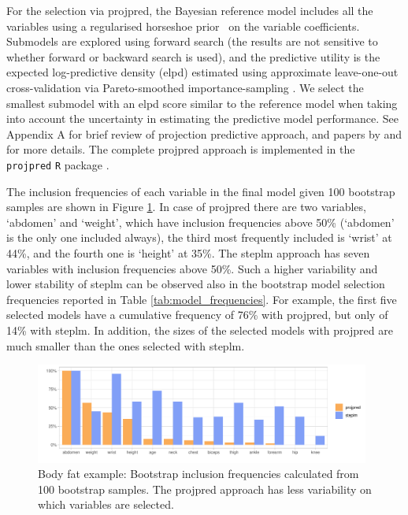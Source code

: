 \documentclass[a4]{article}
\theoremstyle{definition}
\begin{document}
For the selection via projpred, the Bayesian reference model includes
all the variables using a regularised horseshoe prior~\citep{paper:rhs} on the
variable coefficients. Submodels are explored using
forward search (the results are not sensitive to whether forward or
backward search is used), and the predictive utility is the expected
log-predictive density (elpd) estimated using approximate leave-one-out cross-validation via Pareto-smoothed importance-sampling
\citep[PSIS-LOO-CV; ][]{paper:psis_loo}.  We select the smallest  submodel with an elpd score similar to the reference model
when taking into account the uncertainty in estimating the predictive
model performance. See Appendix A for brief review of projection
predictive approach, and papers by \citet{paper:model_selection} and
\citet{paper:projpred} for more details. The complete projpred approach is implemented in the \texttt{projpred} \texttt{R} package \citep{Rprojpred}.

The inclusion frequencies of each variable in the final model given 100
bootstrap samples are shown in Figure
\ref{fig:inclusion_frequencies}. In case of projpred there are two
variables, `abdomen' and `weight', which have inclusion frequencies
above 50\% (`abdomen' is the only one included always), the third most
frequently included is `wrist' at 44\%, and the fourth one is `height'
at 35\%.  The steplm approach has seven variables with inclusion
frequencies above 50\%. Such a higher variability and lower stability
of steplm can be observed also in the bootstrap model selection
frequencies reported in Table \ref{tab:model_frequencies}. For
example, the first five selected models have a cumulative frequency of
76\% with projpred, but only of 14\% with steplm. In addition, the
sizes of the selected models with projpred are much smaller than the ones 
selected with steplm.
\begin{figure}[tp]
  \centering
  \includegraphics[width=0.98\textwidth]{graphics/inc_prob.pdf}
  \vspace{-0.7\baselineskip}
  \caption{Body fat example: Bootstrap inclusion frequencies calculated from 100 bootstrap samples. The projpred approach has less variability on which variables are selected.}
  \label{fig:inclusion_frequencies}
\end{figure}
\end{document}
